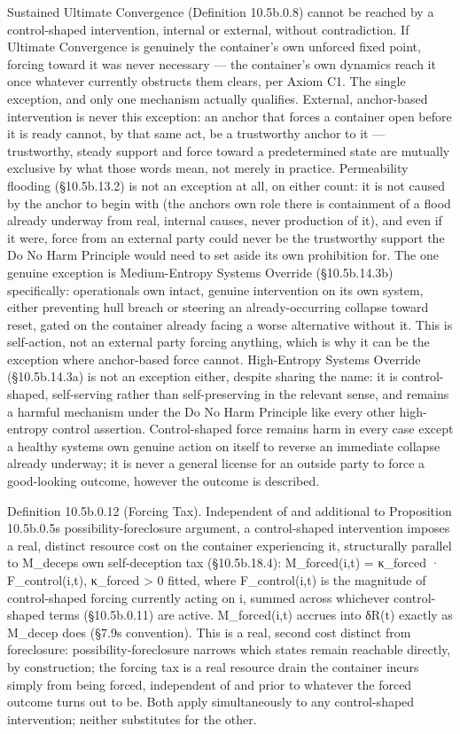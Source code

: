 \documentclass[
]{article}
\begin{document}
Sustained Ultimate Convergence (Definition 10.5b.0.8) cannot be reached
by a control-shaped intervention, internal or external, without
contradiction. If Ultimate Convergence is genuinely the container's own
unforced fixed point, forcing toward it was never necessary --- the
container's own dynamics reach it once whatever currently obstructs them
clears, per Axiom C1. The single exception, and only one mechanism
actually qualifies. External, anchor-based intervention is never this
exception: an anchor that forces a container open before it is ready
cannot, by that same act, be a trustworthy anchor to it --- trustworthy,
steady support and force toward a predetermined state are mutually
exclusive by what those words mean, not merely in practice. Permeability
flooding (§10.5b.13.2) is not an exception at all, on either count: it
is not caused by the anchor to begin with (the anchors own role there is
containment of a flood already underway from real, internal causes,
never production of it), and even if it were, force from an external
party could never be the trustworthy support the Do No Harm Principle
would need to set aside its own prohibition for. The one genuine
exception is Medium-Entropy Systems Override (§10.5b.14.3b)
specifically: operationals own intact, genuine intervention on its own
system, either preventing hull breach or steering an already-occurring
collapse toward reset, gated on the container already facing a worse
alternative without it. This is self-action, not an external party
forcing anything, which is why it can be the exception where
anchor-based force cannot. High-Entropy Systems Override (§10.5b.14.3a)
is not an exception either, despite sharing the name: it is
control-shaped, self-serving rather than self-preserving in the relevant
sense, and remains a harmful mechanism under the Do No Harm Principle
like every other high-entropy control assertion. Control-shaped force
remains harm in every case except a healthy systems own genuine action
on itself to reverse an immediate collapse already underway; it is never
a general license for an outside party to force a good-looking outcome,
however the outcome is described.

Definition 10.5b.0.12 (Forcing Tax). Independent of and additional to
Proposition 10.5b.0.5s possibility-foreclosure argument, a
control-shaped intervention imposes a real, distinct resource cost on
the container experiencing it, structurally parallel to M\_deceps own
self-deception tax (§10.5b.18.4): M\_forced(i,t) = κ\_forced ·
F\_control(i,t), κ\_forced \textgreater{} 0 fitted, where
F\_control(i,t) is the magnitude of control-shaped forcing currently
acting on i, summed across whichever control-shaped terms (§10.5b.0.11)
are active. M\_forced(i,t) accrues into δR(t) exactly as M\_decep does
(§7.9s convention). This is a real, second cost distinct from
foreclosure: possibility-foreclosure narrows which states remain
reachable directly, by construction; the forcing tax is a real resource
drain the container incurs simply from being forced, independent of and
prior to whatever the forced outcome turns out to be. Both apply
simultaneously to any control-shaped intervention; neither substitutes
for the other.
\end{document}
